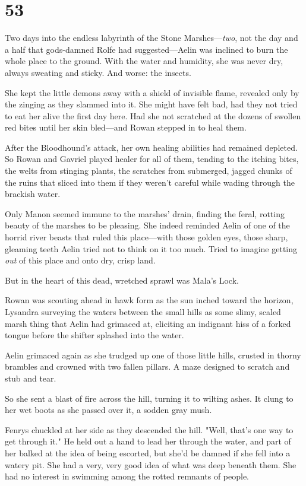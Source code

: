 
\chapter{53}

Two days into the endless labyrinth of the Stone Marshes---\emph{two}, not the day and a half that gods-damned Rolfe had suggested---Aelin was inclined to burn the whole place to the ground. With the water and humidity, she was never dry, always sweating and sticky. And worse: the insects.

She kept the little demons away with a shield of invisible flame, revealed only by the zinging as they slammed into it. She might have felt bad, had they not tried to eat her alive the first day here. Had she not scratched at the dozens of swollen red bites until her skin bled---and Rowan stepped in to heal them.

After the Bloodhound's attack, her own healing abilities had remained depleted. So Rowan and Gavriel played healer for all of them, tending to the itching bites, the welts from stinging plants, the scratches from submerged, jagged chunks of the ruins that sliced into them if they weren't careful while wading through the brackish water.

Only Manon seemed immune to the marshes' drain, finding the feral, rotting beauty of the marshes to be pleasing. She indeed reminded Aelin of one of the horrid river beasts that ruled this place---with those golden eyes, those sharp, gleaming teeth  Aelin tried not to think on it too much. Tried to imagine getting \emph{out} of this place and onto dry, crisp land.

But in the heart of this dead, wretched sprawl was Mala's Lock.

Rowan was scouting ahead in hawk form as the sun inched toward the horizon, Lysandra surveying the waters between the small hills as some slimy, scaled marsh thing that Aelin had grimaced at, eliciting an indignant hiss of a forked tongue before the shifter splashed into the water.

Aelin grimaced again as she trudged up one of those little hills, crusted in thorny brambles and crowned with two fallen pillars. A maze designed to scratch and stub and tear.

So she sent a blast of fire across the hill, turning it to wilting ashes. It clung to her wet boots as she passed over it, a sodden gray mush.

Fenrys chuckled at her side as they descended the hill. "Well, that's one way to get through it." He held out a hand to lead her through the water, and part of her balked at the idea of being escorted, but
 she'd be damned if she fell into a watery pit. She had a very, very good idea of what was deep beneath them. She had no interest in swimming among the rotted remnants of people.

